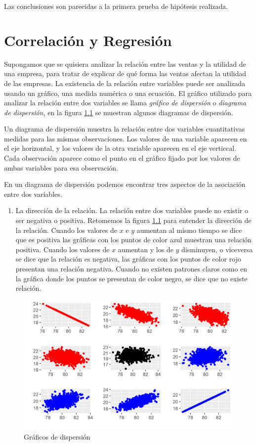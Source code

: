 \documentclass[]{book}
\providecommand{\tightlist}{%
  \setlength{\itemsep}{0pt}\setlength{\parskip}{0pt}}
\begin{document}
Las conclusiones son parecidas a la primera prueba de hipótesis realizada.

\hypertarget{methods}{%
\chapter{Correlación y Regresión}\label{methods}}

Supongamos que se quisiera analizar la relación entre las ventas y la utilidad de una empresa, para tratar de explicar de qué forma las ventas afectan la utilidad de las empresas. La existencia de la relación entre variables puede ser analizada usando un gráfico, una medida numérica o una ecuación.
El gráfico utilizado para analizar la relación entre dos variables se llama \emph{gráfico de dispersión} o \emph{diagrama de dispersión}, en la figura \ref{fig:corr} se muestran algunos diagramas de dispersión.

Un diagrama de dispersión muestra la relación entre dos variables cuantitativas medidas para las mismas observaciones. Los valores de una variable aparecen en el eje horizontal, y los valores de la otra variable aparecen en el eje verticcal. Cada observación aparece como el punto en el gráfico fijado por los valores de ambas variables para esa observación.

En un diagrama de dispersión podemos encontrar tres aspectos de la asociación entre dos variables.

\begin{enumerate}
\def\labelenumi{\arabic{enumi}.}
\tightlist
\item
  La dirección de la relación. La relación entre dos variables puede no existir o ser negativa o positiva. Retomemos la figura \ref{fig:corr} para entender la dirección de la relación. Cuando los valores de \(x\) e \(y\) aumentan al mismo tiempo se dice que es positiva las gráficas con los puntos de color azul muestran una relación positiva. Cuando los valores de \(x\) aumentan y los de \(y\) disminuyen, o viceversa se dice que la relación es negativa, las gráficas con los puntos de color rojo presentan una relación negativa. Cuando no existen patrones claros como en la gráfica donde los puntos se presentan de color negro, se dice que no existe relación.
\end{enumerate}

\begin{figure}[h]

{\centering \includegraphics[width=0.5\linewidth]{corr} 

}

\caption{Gráficos de dispersión}\label{fig:corr}
\end{figure}
\end{document}
